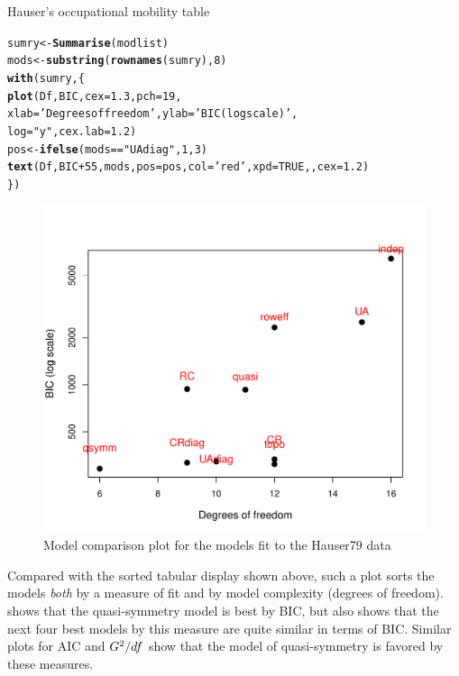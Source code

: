 \documentclass[11pt]{book}\usepackage[]{graphicx}\usepackage[]{color}
\makeatletter
\newcommand{\hlnum}[1]{\textcolor[rgb]{0.686,0.059,0.569}{#1}}%
\newcommand{\hlstr}[1]{\textcolor[rgb]{0.192,0.494,0.8}{#1}}%
\newcommand{\hlopt}[1]{\textcolor[rgb]{0,0,0}{#1}}%
\newcommand{\hlstd}[1]{\textcolor[rgb]{0.345,0.345,0.345}{#1}}%
\newcommand{\hlkwb}[1]{\textcolor[rgb]{0.69,0.353,0.396}{#1}}%
\newcommand{\hlkwc}[1]{\textcolor[rgb]{0.333,0.667,0.333}{#1}}%
\newcommand{\hlkwd}[1]{\textcolor[rgb]{0.737,0.353,0.396}{\textbf{#1}}}%
\newenvironment{kframe}{%
 \def\at@end@of@kframe{}%
 \ifinner\ifhmode%
  \def\at@end@of@kframe{\end{minipage}}%
  \begin{minipage}{\columnwidth}%
 \fi\fi%
 \def\FrameCommand##1{\hskip\@totalleftmargin \hskip-\fboxsep
 \colorbox{shadecolor}{##1}\hskip-\fboxsep
     \hskip-\linewidth \hskip-\@totalleftmargin \hskip\columnwidth}%
 \MakeFramed {\advance\hsize-\width
   \@totalleftmargin\z@ \linewidth\hsize
   \@setminipage}}%
 {\par\unskip\endMakeFramed%
 \at@end@of@kframe}
\newenvironment{knitrout}{}{} %
\renewenvironment{knitrout}{\small\renewcommand{\baselinestretch}{.85}}{} %
\makeatother
\begin{document}
\begin{Example}[hauser2]{Hauser's occupational mobility table}
\begin{knitrout}
\color{fgcolor}\begin{kframe}
\begin{alltt}
\hlstd{sumry} \hlkwb{<-} \hlkwd{Summarise}\hlstd{(modlist)}
\hlstd{mods} \hlkwb{<-} \hlkwd{substring}\hlstd{(}\hlkwd{rownames}\hlstd{(sumry),}\hlnum{8}\hlstd{)}
\hlkwd{with}\hlstd{(sumry, \{}
  \hlkwd{plot}\hlstd{(Df, BIC,} \hlkwc{cex}\hlstd{=}\hlnum{1.3}\hlstd{,} \hlkwc{pch}\hlstd{=}\hlnum{19}\hlstd{,}
       \hlkwc{xlab}\hlstd{=}\hlstr{'Degrees of freedom'}\hlstd{,} \hlkwc{ylab}\hlstd{=}\hlstr{'BIC (log scale)'}\hlstd{,}
       \hlkwc{log}\hlstd{=}\hlstr{"y"}\hlstd{,} \hlkwc{cex.lab}\hlstd{=}\hlnum{1.2}\hlstd{)}
  \hlstd{pos} \hlkwb{<-} \hlkwd{ifelse}\hlstd{(mods}\hlopt{==}\hlstr{"UAdiag"}\hlstd{,} \hlnum{1}\hlstd{,} \hlnum{3}\hlstd{)}
  \hlkwd{text}\hlstd{(Df, BIC}\hlopt{+}\hlnum{55}\hlstd{, mods,} \hlkwc{pos}\hlstd{=pos,} \hlkwc{col}\hlstd{=}\hlstr{'red'}\hlstd{,} \hlkwc{xpd}\hlstd{=}\hlnum{TRUE}\hlstd{, ,} \hlkwc{cex}\hlstd{=}\hlnum{1.2}\hlstd{)}
  \hlstd{\})}
\end{alltt}
\end{kframe}\begin{figure}[!htbp]


\centerline{\includegraphics[width=.7\textwidth]{ch08/fig/hauser-sumry-plot-1} }

\caption[Model comparison plot for the models fit to the Hauser79 data]{Model comparison plot for the models fit to the Hauser79 data\label{fig:hauser-sumry-plot}}
\end{figure}


\end{knitrout}
Compared with the sorted tabular display shown above, such a plot sorts the models \emph{both}
by a measure of fit and by model complexity (degrees of freedom).
 shows that the quasi-symmetry model is best by BIC,
but also shows that the next four best models by this measure are quite similar
in terms of BIC.  Similar plots for AIC and $G^2/df$ show that the model of
quasi-symmetry is favored by these measures.

\end{Example}
\end{document}
